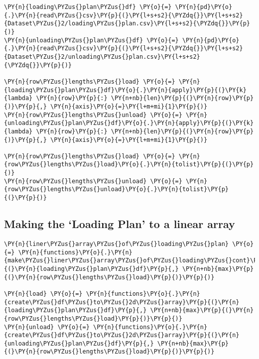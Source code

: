 \begin{tcolorbox}[breakable, size=fbox, boxrule=1pt, pad at break*=1mm,colback=cellbackground, colframe=cellborder]
\begin{Verbatim}[commandchars=\\\{\}]
\PY{n}{loading\PYZus{}plan\PYZus{}df} \PY{o}{=} \PY{n}{pd}\PY{o}{.}\PY{n}{read\PYZus{}csv}\PY{p}{(}\PY{l+s+s2}{\PYZdq{}}\PY{l+s+s2}{Dataset\PYZus{}2/loading\PYZus{}plan.csv}\PY{l+s+s2}{\PYZdq{}}\PY{p}{)}
\PY{n}{unloading\PYZus{}plan\PYZus{}df} \PY{o}{=} \PY{n}{pd}\PY{o}{.}\PY{n}{read\PYZus{}csv}\PY{p}{(}\PY{l+s+s2}{\PYZdq{}}\PY{l+s+s2}{Dataset\PYZus{}2/unloading\PYZus{}plan.csv}\PY{l+s+s2}{\PYZdq{}}\PY{p}{)}

\PY{n}{row\PYZus{}lengths\PYZus{}load} \PY{o}{=} \PY{n}{loading\PYZus{}plan\PYZus{}df}\PY{o}{.}\PY{n}{apply}\PY{p}{(}\PY{k}{lambda} \PY{n}{row}\PY{p}{:} \PY{n+nb}{len}\PY{p}{(}\PY{n}{row}\PY{p}{)}\PY{p}{,} \PY{n}{axis}\PY{o}{=}\PY{l+m+mi}{1}\PY{p}{)}
\PY{n}{row\PYZus{}lengths\PYZus{}unload} \PY{o}{=} \PY{n}{unloading\PYZus{}plan\PYZus{}df}\PY{o}{.}\PY{n}{apply}\PY{p}{(}\PY{k}{lambda} \PY{n}{row}\PY{p}{:} \PY{n+nb}{len}\PY{p}{(}\PY{n}{row}\PY{p}{)}\PY{p}{,} \PY{n}{axis}\PY{o}{=}\PY{l+m+mi}{1}\PY{p}{)}

\PY{n}{row\PYZus{}lengths\PYZus{}load} \PY{o}{=} \PY{n}{row\PYZus{}lengths\PYZus{}load}\PY{o}{.}\PY{n}{tolist}\PY{p}{(}\PY{p}{)}
\PY{n}{row\PYZus{}lengths\PYZus{}unload} \PY{o}{=} \PY{n}{row\PYZus{}lengths\PYZus{}unload}\PY{o}{.}\PY{n}{tolist}\PY{p}{(}\PY{p}{)}
\end{Verbatim}
\end{tcolorbox}

\subsection*{Making the `Loading Plan' to a linear
array}\label{making-the-loading-plan-to-a-linear-array}

\begin{tcolorbox}[breakable, size=fbox, boxrule=1pt, pad at break*=1mm,colback=cellbackground, colframe=cellborder]
\begin{Verbatim}[commandchars=\\\{\}]
\PY{n}{liner\PYZus{}array\PYZus{}of\PYZus{}loading\PYZus{}plan} \PY{o}{=} \PY{n}{functions}\PY{o}{.}\PY{n}{make\PYZus{}liner\PYZus{}array\PYZus{}of\PYZus{}loading\PYZus{}cont}\PY{p}{(}\PY{n}{loading\PYZus{}plan\PYZus{}df}\PY{p}{,} \PY{n+nb}{max}\PY{p}{(}\PY{n}{row\PYZus{}lengths\PYZus{}load}\PY{p}{)}\PY{p}{)}

\PY{n}{load} \PY{o}{=} \PY{n}{functions}\PY{o}{.}\PY{n}{create\PYZus{}df\PYZus{}to\PYZus{}2d\PYZus{}array}\PY{p}{(}\PY{n}{loading\PYZus{}plan\PYZus{}df}\PY{p}{,} \PY{n+nb}{max}\PY{p}{(}\PY{n}{row\PYZus{}lengths\PYZus{}load}\PY{p}{)}\PY{p}{)}
\PY{n}{unload} \PY{o}{=} \PY{n}{functions}\PY{o}{.}\PY{n}{create\PYZus{}df\PYZus{}to\PYZus{}2d\PYZus{}array}\PY{p}{(}\PY{n}{unloading\PYZus{}plan\PYZus{}df}\PY{p}{,} \PY{n+nb}{max}\PY{p}{(}\PY{n}{row\PYZus{}lengths\PYZus{}load}\PY{p}{)}\PY{p}{)}
\end{Verbatim}
\end{tcolorbox}

